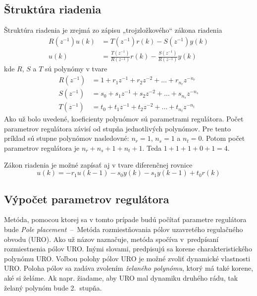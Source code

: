 \documentclass[a4paper, 10pt, ]{article}
\begin{document}
\subsection{Štruktúra riadenia}

Štruktúra riadenia je zrejmá zo zápisu „trojzložkového“ zákona riadenia
\begin{equation} \label{zakonRiadenia}
	\begin{split}
		R(z^{-1})u(k) & = T(z^{-1})r(k) - S(z^{-1})y(k) \\
		u(k) & = \frac{T(z^{-1})}{R(z^{-1})}r(k) - \frac{S(z^{-1})}{R(z^{-1})}y(k)
	\end{split}
\end{equation}
kde $R$, $S$ a $T$ sú polynómy v tvare
\begin{equation}
	\begin{split}
		R(z^{-1}) & = 1 + r_1z^{-1} + r_2z^{-2} + \ldots +  r_{n_r}z^{-n_r}\\
		S(z^{-1}) & = s_0 + s_1z^{-1} + s_2z^{-2} + \ldots +  s_{n_s}z^{-n_s} \\
		T(z^{-1}) & = t_0 + t_1z^{-1} + t_2z^{-2} + \ldots +  t_{n_t}z^{-n_t}
	\end{split}
\end{equation}
Ako už bolo uvedené, koeficienty polynómov sú parametrami regulátora. Počet parametrov regulátora závisí od stupňa jednotlivých polynómov. Pre tento príklad sú stupne polynómov nasledovné: $n_r = 1$, $n_s = 1$ a $n_t = 0$. Potom počet parametrov regulátora je $n_r + n_s + 1 + n_t + 1$. Teda $1 + 1 + 1 + 0 + 1 = 4$.

Zákon riadenia je možné zapísať aj v tvare diferenčnej rovnice
\begin{equation}
	u(k) =  - r_1 u(k-1) - s_0 y(k) - s_1 y(k-1) + t_0 r(k)
\end{equation}




\subsection{Výpočet parametrov regulátora}

Metóda, pomocou ktorej sa v tomto prípade budú počítať parametre regulátora bude \emph{Pole placement}~--~Metóda rozmiestňovania pólov uzavretého regulačného obvodu (URO). Ako už názov naznačuje, metóda spočíva v~predpísaní rozmiestnenia pólov URO. Inými slovami, predpisujú sa korene charakteristického polynómu URO. Voľbou polohy pólov URO je možné zvoliť dynamické vlastnosti URO. Poloha pólov sa zadáva zvolením \emph{želaného polynómu}, ktorý má také korene, aké si želáme. Ak napr. žiadame, aby URO mal dynamiku druhého rádu, tak želaný polynóm bude 2.~stupňa.
\end{document}
